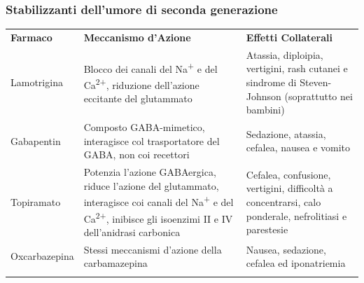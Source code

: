 \subsubsection{Stabilizzanti dell'umore di seconda generazione}

\begin{table}
\begin{tabular}{p{}p{}p{}}
\hline\noalign{\smallskip}
\textbf{Farmaco} & \textbf{Meccanismo d'Azione} & \textbf{Effetti Collaterali}  \\
\noalign{\smallskip}\svhline\noalign{\smallskip}

Lamotrigina &	Blocco dei canali del Na\textsuperscript{+} e del
Ca\textsuperscript{2+}, riduzione dell'azione eccitante del glutammato	& Atassia, diploipia, vertigini, rash cutanei e sindrome di Steven-Johnson (soprattutto nei bambini) \\
Gabapentin &	 Composto GABA-mimetico, interagisce col
trasportatore del GABA, non coi recettori & Sedazione, atassia, cefalea, nausea e vomito \\
Topiramato &	 Potenzia l'azione GABAergica, riduce l'azione del
glutammato, interagisce coi canali del Na\textsuperscript{+} e del
Ca\textsuperscript{2+}, inibisce gli isoenzimi II e IV dell'anidrasi carbonica	& Cefalea, confusione, vertigini, difficoltà a concentrarsi,
calo ponderale, nefrolitiasi e parestesie \\
Oxcarbazepina & Stessi meccanismi d'azione della carbamazepina & Nausea, sedazione, cefalea ed iponatriemia \\

\noalign{\smallskip}\hline\noalign{\smallskip}
\end{tabular}
\end{table}

